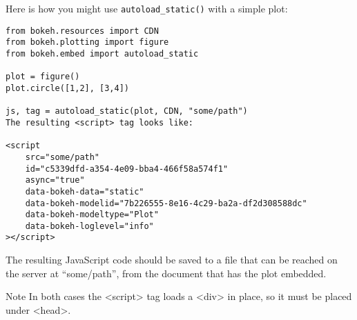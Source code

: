 Here is how you might use \texttt{autoload\_static()} with a simple plot:
\begin{framed}
	\begin{verbatim}
from bokeh.resources import CDN
from bokeh.plotting import figure
from bokeh.embed import autoload_static

plot = figure()
plot.circle([1,2], [3,4])

js, tag = autoload_static(plot, CDN, "some/path")
The resulting <script> tag looks like:

<script
    src="some/path"
    id="c5339dfd-a354-4e09-bba4-466f58a574f1"
    async="true"
    data-bokeh-data="static"
    data-bokeh-modelid="7b226555-8e16-4c29-ba2a-df2d308588dc"
    data-bokeh-modeltype="Plot"
    data-bokeh-loglevel="info"
></script>
\end{verbatim}
\end{framed}
The resulting JavaScript code should be saved to a file that can be reached on the server at “some/path”, from the document that has the plot embedded.

Note
In both cases the <script> tag loads a <div> in place, so it must be placed under <head>.


